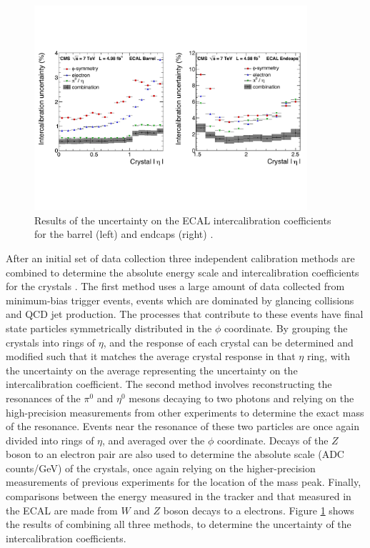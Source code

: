 \begin{figure}[h]
   \centering
  \includegraphics[width=0.9\textwidth]{Figures/Reconstruction_Diagrams/ECAL_intercalibration_combined_methods.pdf}
  \caption{Results of the uncertainty on the ECAL intercalibration
    coefficients for the barrel (left) and endcaps (right)
    \cite{Chatrchyan:1554142}. } \label{fig:ecal_intercal}
\end{figure}

\par After an initial set of data collection three independent
calibration methods are combined to determine the absolute energy
scale and intercalibration coefficients for the crystals
\cite{Chatrchyan:1554142}.  The first method uses a large amount of
data collected from minimum-bias trigger events, events which are
dominated by glancing collisions and QCD jet production.  The
processes that contribute to these events have final state particles
symmetrically distributed in the $\phi$ coordinate.  By grouping the
crystals into rings of $\eta$, and the response of each crystal can be
determined and modified such that it matches the average crystal
response in that $\eta$ ring, with the uncertainty on the average
representing the uncertainty on the intercalibration coefficient.  The
second method involves reconstructing the resonances of the $\pi^{0}$
and $\eta^{0}$ mesons decaying to two photons and relying on the
high-precision measurements from other experiments to determine the
exact mass of the resonance.  Events near the resonance of these two
particles are once again divided into rings of $\eta$, and averaged
over the $\phi$ coordinate.  Decays of the $Z$ boson to an electron pair
are also used to determine the absolute scale (ADC counts/GeV) of the
crystals, once again relying on the higher-precision measurements of
previous experiments for the location of the mass peak.  Finally,
comparisons between the energy measured in the tracker and that
measured in the ECAL are made from $W$ and $Z$ boson decays to a
electrons.  Figure \ref{fig:ecal_intercal} shows the results of
combining all three methods, to determine the uncertainty of the
intercalibration coefficients.  

